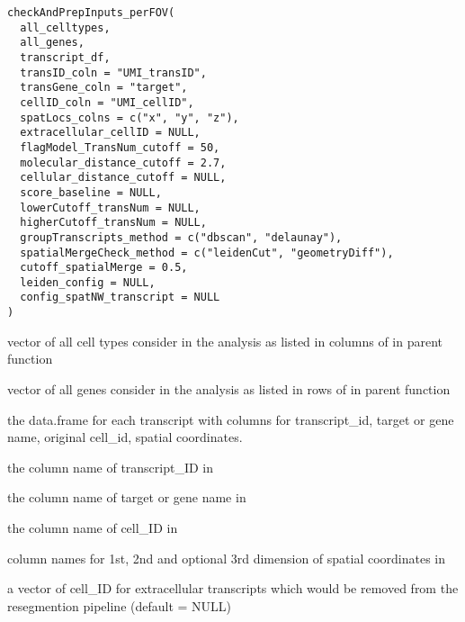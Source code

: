 \documentclass[letterpaper]{book}
\begin{document}
%
\begin{Usage}
\begin{verbatim}
checkAndPrepInputs_perFOV(
  all_celltypes,
  all_genes,
  transcript_df,
  transID_coln = "UMI_transID",
  transGene_coln = "target",
  cellID_coln = "UMI_cellID",
  spatLocs_colns = c("x", "y", "z"),
  extracellular_cellID = NULL,
  flagModel_TransNum_cutoff = 50,
  molecular_distance_cutoff = 2.7,
  cellular_distance_cutoff = NULL,
  score_baseline = NULL,
  lowerCutoff_transNum = NULL,
  higherCutoff_transNum = NULL,
  groupTranscripts_method = c("dbscan", "delaunay"),
  spatialMergeCheck_method = c("leidenCut", "geometryDiff"),
  cutoff_spatialMerge = 0.5,
  leiden_config = NULL,
  config_spatNW_transcript = NULL
)
\end{verbatim}
\end{Usage}
%
\begin{Arguments}
\begin{ldescription}
\item[\code{all\_celltypes}] vector of all cell types consider in the analysis as listed in columns of  in parent function

\item[\code{all\_genes}] vector of all genes consider in the analysis as listed in rows of  in parent function

\item[\code{transcript\_df}] the data.frame for each transcript with columns for transcript\_id, target or gene name, original cell\_id, spatial coordinates.

\item[\code{transID\_coln}] the column name of transcript\_ID in 

\item[\code{transGene\_coln}] the column name of target or gene name in 

\item[\code{cellID\_coln}] the column name of cell\_ID in 

\item[\code{spatLocs\_colns}] column names for 1st, 2nd and optional 3rd dimension of spatial coordinates in 

\item[\code{extracellular\_cellID}] a vector of cell\_ID for extracellular transcripts which would be removed from the resegmention pipeline (default = NULL)


\end{ldescription}
\end{Arguments}
\end{document}
